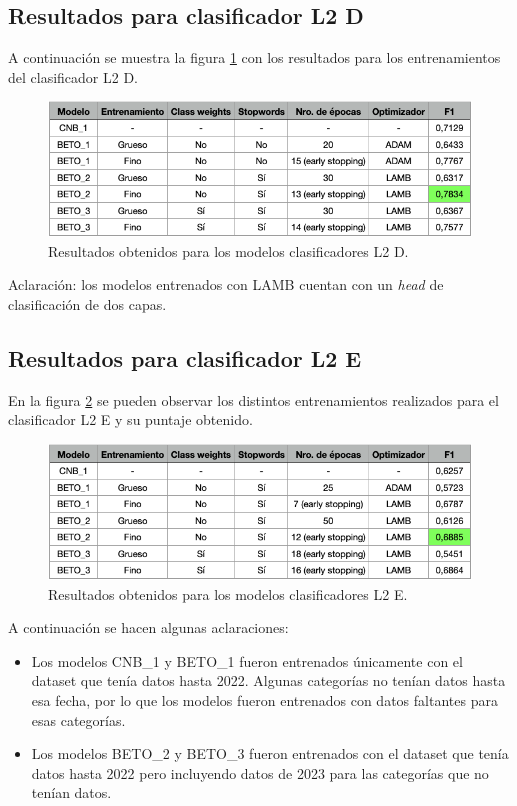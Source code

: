 \subsection{Resultados para clasificador L2 D}

A continuación se muestra la figura \ref{fig:res-l2d} con los resultados para los entrenamientos del clasificador L2 D.

\begin{figure}[htbp]
	\centering
	\includegraphics[width=1\textwidth]{./Figures/cap4-resultados-l2d.png}
	\caption{Resultados obtenidos para los modelos clasificadores L2 D.}
	\label{fig:res-l2d}
\end{figure}

Aclaración: los modelos entrenados con LAMB cuentan con un \textit{head} de clasificación de dos capas.

\subsection{Resultados para clasificador L2 E}

En la figura \ref{fig:res-l2e} se pueden observar los distintos entrenamientos realizados para el clasificador L2 E y su puntaje obtenido.

\begin{figure}[H]
	\centering
	\includegraphics[width=1\textwidth]{./Figures/cap4-resultados-l2e.png}
	\caption{Resultados obtenidos para los modelos clasificadores L2 E.}
	\label{fig:res-l2e}
\end{figure}

A continuación se hacen algunas aclaraciones:
\begin{itemize}
	\item Los modelos CNB\_1 y BETO\_1 fueron entrenados únicamente con el dataset que tenía datos hasta 2022. Algunas categorías no tenían datos hasta esa fecha, por lo que los modelos fueron entrenados con datos faltantes para esas categorías.
	\item Los modelos BETO\_2 y BETO\_3 fueron entrenados con el dataset que tenía datos hasta 2022 pero incluyendo datos de 2023 para las categorías que no tenían datos.
\end{itemize}

